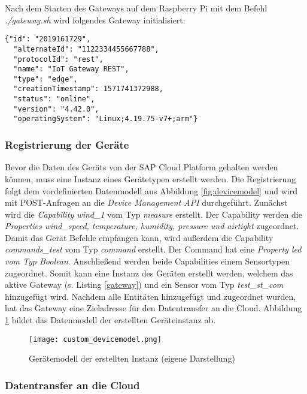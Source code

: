 \noindent Nach dem Starten des Gateways auf dem Raspberry Pi mit dem Befehl \textit{./gateway.sh} wird folgendes Gateway initialisiert:

\begin{lstlisting}[caption= Gateway-Eigenschaften, label=gateway]
  {"id": "2019161729",
  "alternateId": "1122334455667788",
  "protocolId": "rest",
  "name": "IoT Gateway REST",
  "type": "edge",
  "creationTimestamp": 1571741372988,
  "status": "online",
  "version": "4.42.0",
  "operatingSystem": "Linux;4.19.75-v7+;arm"}\end{lstlisting}

\subsubsection{Registrierung der Geräte}

Bevor die Daten des Geräts von der SAP Cloud Platform gehalten werden können, muss eine Instanz eines Gerätetypen erstellt werden. Die Registrierung folgt dem vordefinierten Datenmodell aus Abbildung \ref{fig:devicemodel} und wird mit POST-Anfragen an die \textit{Device Management API} durchgeführt. Zunächst wird die \textit{Capability wind\_1} vom Typ \textit{measure} erstellt. Der Capability werden die \textit{Properties wind\_speed, temperature, humidity, pressure und airtight} zugeordnet. Damit das Gerät Befehle empfangen kann, wird außerdem die Capability \textit{commands\_test} vom Typ \textit{command} erstellt. Der Command hat eine \textit{Property led vom Typ Boolean}. Anschließend werden beide Capabilities einem Sensortypen zugeordnet. Somit kann eine Instanz des Geräten erstellt werden, welchem das aktive Gateway (s. Listing \ref{gateway}) und ein Sensor vom Typ \textit{test\_st\_com} hinzugefügt wird. Nachdem alle Entitäten hinzugefügt und zugeordnet wurden, hat das Gateway eine Zieladresse für den Datentransfer an die Cloud. Abbildung \ref{customdevicemodel} bildet das Datenmodell der erstellten Geräteinstanz ab.

\begin{figure} [H]
  \texttt{[image: custom\_devicemodel.png]}
  \caption[Gerätemodell der erstellten Instanz]{Gerätemodell der erstellten Instanz (eigene Darstellung)}
  \label{customdevicemodel}
\end{figure}
\newpage

\subsubsection{Datentransfer an die Cloud}

